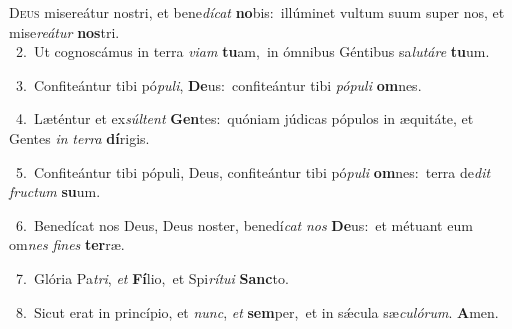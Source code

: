 \lettrine{\initial\textcolor{\initialcolor}{D}}{eus} misereátur nostri, et bene\-\textit{dí}\-\textit{cat} \textbf{no}\-bis:~\star illúminet vultum suum super nos, et mise\-\textit{re}\-\textit{á}\textit{tur} \textbf{nos}\-tri.\\
{\numbfont\textcolor{\numbcolor}{~2.}}~Ut cognoscámus in terra \textit{vi}\-\textit{am} \textbf{tu}\-am,~\star in ómnibus Géntibus sa\-\textit{lu}\-\textit{tá}\textit{re} \textbf{tu}\-um.\par
{\numbfont\textcolor{\numbcolor}{~3.}}~Confiteántur tibi pó\-\textit{pu}\-\textit{li}, \textbf{De}\-us:~\star confiteántur tibi \textit{pó}\-\textit{pu}\textit{li} \textbf{om}\-nes.\par
{\numbfont\textcolor{\numbcolor}{~4.}}~Læténtur et ex\-\textit{súl}\-\textit{tent} \textbf{Gen}\-tes:~\star quóniam júdicas pópulos in æquitáte, et Gentes \textit{in} \textit{ter}\-\textit{ra} \textbf{dí}\-rigis.\par
{\numbfont\textcolor{\numbcolor}{~5.}}~Confiteántur tibi pópuli, Deus, confiteántur tibi pó\-\textit{pu}\-\textit{li} \textbf{om}\-nes:~\star terra de\textit{dit} \textit{fruc}\-\textit{tum} \textbf{su}\-um.\par
{\numbfont\textcolor{\numbcolor}{~6.}}~Benedícat nos Deus, Deus noster, benedí\textit{cat} \textit{nos} \textbf{De}\-us:~\star et métuant eum om\textit{nes} \textit{fi}\-\textit{nes} \textbf{ter}\-ræ.\par
{\numbfont\textcolor{\numbcolor}{~7.}}~Glória Pa\-\textit{tri}\-, \textit{et} \textbf{Fí}\-lio,~\star et Spi\-\textit{rí}\-\textit{tu}\textit{i} \textbf{Sanc}\-to.\par
{\numbfont\textcolor{\numbcolor}{~8.}}~Sicut erat in princípio, et \textit{nunc}\-, \textit{et} \textbf{sem}\-per,~\star et in sǽcula sæ\-\textit{cu}\-\textit{ló}\textit{rum}. \textbf{A}\-men.\par
